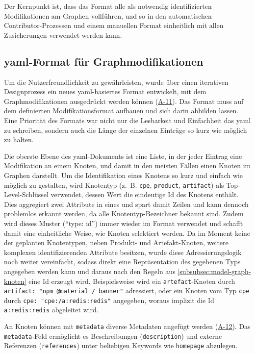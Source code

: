 Der Kernpunkt ist, dass das Format alle als notwendig identifizierten Modifikationen am Graphen vollführen, und so in den automatischen Contributor-Prozessen und einem manuellen Format einheitlich mit allen Zusicherungen verwendet werden kann.

\subsection{\acrshort{yaml}-Format für Graphmodifikationen}\label{subsec:modell-graph-modification-yaml}

Um die Nutzerfreundlichkeit zu gewährleisten, wurde über einen iterativen Designprozess ein neues \acrshort{yaml}-basiertes Format entwickelt, mit dem Graphmodifikationen ausgedrückt werden können (\hyperref[subsec:req-manual-format-modification-for-real]{A-11}).
Das Format muss auf dem definierten Modifikationsformat aufbauen und sich darin abbilden lassen.
Eine Priorität des Formats war nicht nur die Lesbarkeit und Einfachheit das \acrshort{yaml} zu schreiben, sondern auch die Länge der einzelnen Einträge so kurz wie möglich zu halten.

Die oberste Ebene des \acrshort{yaml}-Dokuments ist eine Liste, in der jeder Eintrag eine Modifikation an einem Knoten, und damit in den meisten Fällen einen Knoten im Graphen darstellt.
Um die Identifikation eines Knotens so kurz und einfach wie möglich zu gestalten, wird Knotentyp (z.\ B. \texttt{cpe}, \texttt{product}, \texttt{artifact}) als Top-Level-Schlüssel verwendet, dessen Wert die eindeutige Id des Knotens enthält.
Dies aggregiert zwei Attribute in eines und spart damit Zeilen und kann dennoch problemlos erkannt werden, da alle Knotentyp-Bezeichner bekannt sind.
Zudem wird dieses Muster (\enquote{type: id}) immer wieder im Format verwendet und schafft damit eine einheitliche Weise, wie Knoten selektiert werden.
Da im Moment keine der geplanten Knotentypen, neben Produkt- und Artefakt-Knoten, weitere komplexen identifizierenden Attribute besitzen, wurde diese Adressierungslogik noch weiter vereinfacht, sodass direkt eine Repräsentation des gegebenen Typs angegeben werden kann und daraus nach den Regeln aus \autoref{subsubsec:model-graph-knoten} eine Id erzeugt wird.
Beispielsweise wird ein \texttt{artefact}-Knoten durch \texttt{artifact: "npm @material / banner"} adressiert, oder ein Knoten vom Typ \texttt{cpe} durch \texttt{cpe: "cpe:/a:redis:redis"} angegeben, woraus implizit die Id \texttt{a:redis:redis} abgeleitet wird.

An Knoten können mit \texttt{metadata} diverse Metadaten angefügt werden (\hyperref[subsec:req-reason-format]{A-12}).
Das \texttt{metadata}-Feld ermöglicht es Beschreibungen (\texttt{description}) und externe Referenzen (\texttt{references}) unter beliebigen Keywords wie \texttt{homepage} abzulegen.

